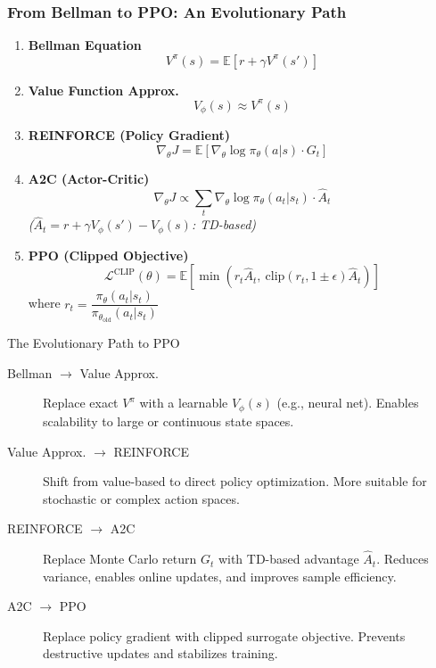 \begin{frame}
    \frametitle{From Bellman to PPO: An Evolutionary Path}
    \small %

    \begin{multicols}{2}
        \begin{enumerate}
            \item \textbf{Bellman Equation}
            \[ V^\pi(s) = \mathbb{E}[r + \gamma V^\pi(s')] \]

            \item \textbf{Value Function Approx.}
            \[ V_\phi(s) \approx V^\pi(s) \]

            \item \textbf{REINFORCE (Policy Gradient)}
            \[ \nabla_\theta J = \mathbb{E}\left[\nabla_\theta \log \pi_\theta(a|s) \cdot G_t\right] \]
            
            \columnbreak %

            \item \textbf{A2C (Actor-Critic)}
            \[ \nabla_\theta J \propto \sum_t \nabla_\theta \log \pi_\theta(a_t|s_t) \cdot \hat{A}_t \]
            \textit{($\hat{A}_t = r + \gamma V_\phi(s') - V_\phi(s)$: TD-based)}

            \item \textbf{PPO (Clipped Objective)}
            \[ \mathcal{L}^{\text{CLIP}}(\theta) = \mathbb{E}\left[\min\left(r_t \hat{A}_t,\ \text{clip}(r_t, 1\pm\epsilon) \hat{A}_t\right)\right] \]
            where \( r_t = \dfrac{\pi_\theta(a_t|s_t)}{\pi_{\theta_{\text{old}}}(a_t|s_t)} \)
        \end{enumerate}
    \end{multicols}
    \vspace{-1em} %
    \begin{block}{The Evolutionary Path to PPO}
        \begin{description}
            \item[Bellman $\to$ Value Approx.] Replace exact $V^\pi$ with a learnable $V_\phi(s)$ (e.g., neural net). Enables scalability to large or continuous state spaces.

            \item[Value Approx. $\to$ REINFORCE] Shift from value-based to direct policy optimization. More suitable for stochastic or complex action spaces.

            \item[REINFORCE $\to$ A2C] Replace Monte Carlo return $G_t$ with TD-based advantage $\hat{A}_t$. Reduces variance, enables online updates, and improves sample efficiency.

            \item[A2C $\to$ PPO] Replace policy gradient with clipped surrogate objective. Prevents destructive updates and stabilizes training.
        \end{description}
    \end{block}
\end{frame}

